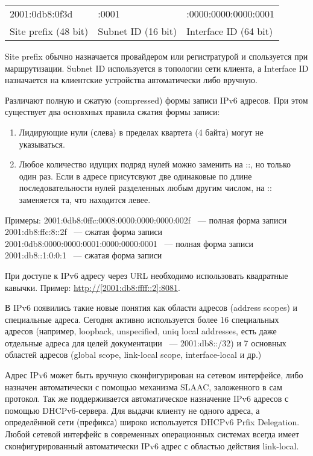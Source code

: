 \documentclass[10pt, a5paper]{article}
\begin{document}
\begin{table}[h!]
  \centering
  \begin{tabular}{ l l l }
    2001:0db8:0f3d  & :0001  & :0000:0000:0000:0001  \\
     Site prefix (48 bit)  &  Subnet ID (16 bit)  &  Interface ID (64 bit)  \\
  \end{tabular}
\end{table}
Site prefix обычно назначается провайдером или регистратурой и спользуется при маршрутизации. Subnet ID используется в топологии сети клиента, а Interface ID назначается на клиентские устройства автоматически либо вручную.

Различают полную и сжатую (compressed) формы записи IPv6 адресов. При этом существует два основхных правила сжатия формы записи:

\begin{enumerate}
  \item Лидирующие нули (слева) в пределах квартета (4 байта) могут не указываться.
  \item Любое количество идущих подряд нулей можно заменить на ::, но только один раз. Если в адресе присутсвуют две одинаковые по длине последовательности нулей разделенных любым другим числом, на :: заменяется та, что находится левее.
\end{enumerate}

Примеры:
2001:0db8:0ffc:0008:0000:0000:0000:002f ~--- полная форма записи
2001:db8:ffc:8::2f ~--- сжатая форма записи
2001:0db8:0000:0000:0001:0000:0000:0001 ~--- полная форма записи
2001:db8::1:0:0:1 ~--- сжатая форма записи

При доступе к IPv6 адресу через URL необходимо использовать квадратные кавычки. Пример: \url{ http://[2001:db8:ffff::2]:8081}.

В IPv6 появились такие новые понятия как области адресов (address scopes) и специальные адреса. Сегодня активно используется более 16 специальных адресов (например, loopback, unspecified, uniq local addresses, есть даже отдельные адреса для целей документации ~--- 2001:db8::/32) и 7 основных областей адресов (global scope, link-local scope, interface-local и др.)

Адрес IPv6 может быть вручную сконфигурирован на сетевом интерфейсе, либо назначен автоматически с помощью механизма SLAAC, заложенного в сам протокол. Так же поддерживается автоматическое назначение IPv6 адресов с помощью DHCPv6-сервера. Для выдачи клиенту не одного адреса, а определённой сети (префикса) широко используется DHCPv6 Prfix Delegation. ~\cite{Semernik-4} Любой сетевой интерфейс в современных операционных системах всегда имеет сконфигурированный автоматически IPv6 адрес с областью действия link-local.
\end{document}
